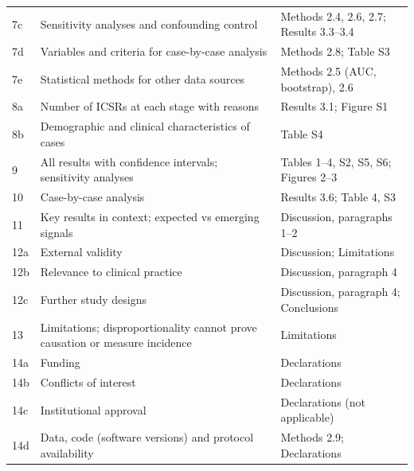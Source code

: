 \documentclass[10pt]{article}
\begin{document}
{\begin{longtable}{p{1cm}p{12cm}p{8cm}}
7c & Sensitivity analyses and confounding control & Methods 2.4, 2.6, 2.7; Results 3.3--3.4 \\
7d & Variables and criteria for case-by-case analysis & Methods 2.8; Table S3 \\
7e & Statistical methods for other data sources & Methods 2.5 (AUC, bootstrap), 2.6 \\
8a & Number of ICSRs at each stage with reasons & Results 3.1; Figure S1 \\
8b & Demographic and clinical characteristics of cases & Table S4 \\
9 & All results with confidence intervals; sensitivity analyses & Tables 1--4, S2, S5, S6; Figures 2--3 \\
10 & Case-by-case analysis & Results 3.6; Table 4, S3 \\
11 & Key results in context; expected vs emerging signals & Discussion, paragraphs 1--2 \\
12a & External validity & Discussion; Limitations \\
12b & Relevance to clinical practice & Discussion, paragraph 4 \\
12c & Further study designs & Discussion, paragraph 4; Conclusions \\
13 & Limitations; disproportionality cannot prove causation or measure incidence & Limitations \\
14a & Funding & Declarations \\
14b & Conflicts of interest & Declarations \\
14c & Institutional approval & Declarations (not applicable) \\
14d & Data, code (software versions) and protocol availability & Methods 2.9; Declarations \\
\bottomrule
\end{longtable}}
\end{document}
